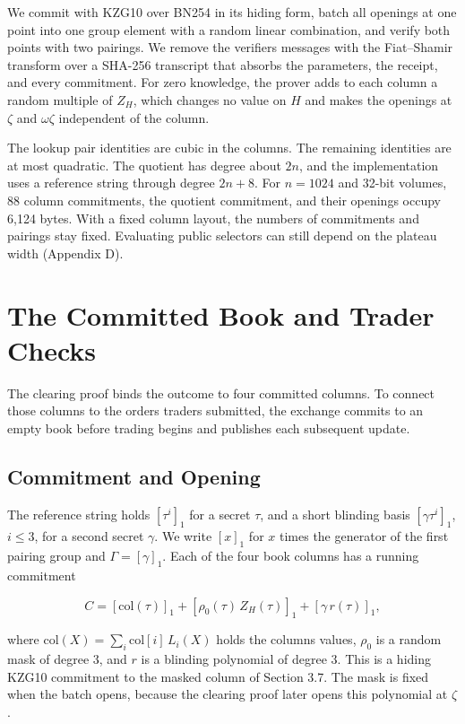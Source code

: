 We commit with KZG10 \cite{KZG10} over BN254 in its hiding form, batch all openings at one point into one group element with a random linear combination, and verify both points with two pairings. We remove the verifier\textquotesingle s messages with the Fiat--Shamir transform over a SHA-256 transcript that absorbs the parameters, the receipt, and every commitment. For zero knowledge, the prover adds to each column a random multiple of \(Z_H\), which changes no value on \(H\) and makes the openings at \(\zeta\) and \(\omega\zeta\) independent of the column.

The lookup pair identities are cubic in the columns. The remaining identities are at most quadratic. The quotient has degree about \(2n\), and the implementation uses a reference string through degree \(2n+8\). For \(n=1024\) and 32-bit volumes, 88 column commitments, the quotient commitment, and their openings occupy 6,124 bytes. With a fixed column layout, the numbers of commitments and pairings stay fixed. Evaluating public selectors can still depend on the plateau width (Appendix D).

\section{The Committed Book and Trader Checks}

The clearing proof binds the outcome to four committed columns. To connect those columns to the orders traders submitted, the exchange commits to an empty book before trading begins and publishes each subsequent update.

\subsection{Commitment and Opening}

The reference string holds \([\tau^i]_1\) for a secret \(\tau\), and a short blinding basis \([\gamma\tau^i]_1\), \(i \le 3\), for a second secret \(\gamma\). We write \([x]_1\) for \(x\) times the generator of the first pairing group and \(\Gamma = [\gamma]_1\). Each of the four book columns has a running commitment

\[C = [\mathrm{col}(\tau)]_1 + [\rho_0(\tau)\,Z_H(\tau)]_1 + [\gamma\, r(\tau)]_1,\]

where \(\mathrm{col}(X) = \sum_i \mathrm{col}[i]\, L_i(X)\) holds the column\textquotesingle s values, \(\rho_0\) is a random mask of degree 3, and \(r\) is a blinding polynomial of degree 3. This is a hiding KZG10 commitment \cite{KZG10} to the masked column of Section 3.7. The mask is fixed when the batch opens, because the clearing proof later opens this polynomial at \(\zeta\).

